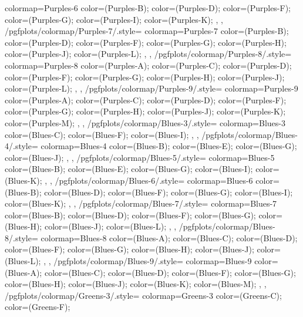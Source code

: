 {{    colormap={Purples-6}{
      color=(Purples-B);
      color=(Purples-D);
      color=(Purples-F);
      color=(Purples-G);
      color=(Purples-I);
      color=(Purples-K);
    },
  },
  /pgfplots/colormap/Purples-7/.style={
    colormap={Purples-7}{
      color=(Purples-B);
      color=(Purples-D);
      color=(Purples-F);
      color=(Purples-G);
      color=(Purples-H);
      color=(Purples-J);
      color=(Purples-L);
    },
  },
  /pgfplots/colormap/Purples-8/.style={
    colormap={Purples-8}{
      color=(Purples-A);
      color=(Purples-C);
      color=(Purples-D);
      color=(Purples-F);
      color=(Purples-G);
      color=(Purples-H);
      color=(Purples-J);
      color=(Purples-L);
    },
  },
  /pgfplots/colormap/Purples-9/.style={
    colormap={Purples-9}{
      color=(Purples-A);
      color=(Purples-C);
      color=(Purples-D);
      color=(Purples-F);
      color=(Purples-G);
      color=(Purples-H);
      color=(Purples-J);
      color=(Purples-K);
      color=(Purples-M);
    },
  },
  /pgfplots/colormap/Blues-3/.style={
    colormap={Blues-3}{
      color=(Blues-C);
      color=(Blues-F);
      color=(Blues-I);
    },
  },
  /pgfplots/colormap/Blues-4/.style={
    colormap={Blues-4}{
      color=(Blues-B);
      color=(Blues-E);
      color=(Blues-G);
      color=(Blues-J);
    },
  },
  /pgfplots/colormap/Blues-5/.style={
    colormap={Blues-5}{
      color=(Blues-B);
      color=(Blues-E);
      color=(Blues-G);
      color=(Blues-I);
      color=(Blues-K);
    },
  },
  /pgfplots/colormap/Blues-6/.style={
    colormap={Blues-6}{
      color=(Blues-B);
      color=(Blues-D);
      color=(Blues-F);
      color=(Blues-G);
      color=(Blues-I);
      color=(Blues-K);
    },
  },
  /pgfplots/colormap/Blues-7/.style={
    colormap={Blues-7}{
      color=(Blues-B);
      color=(Blues-D);
      color=(Blues-F);
      color=(Blues-G);
      color=(Blues-H);
      color=(Blues-J);
      color=(Blues-L);
    },
  },
  /pgfplots/colormap/Blues-8/.style={
    colormap={Blues-8}{
      color=(Blues-A);
      color=(Blues-C);
      color=(Blues-D);
      color=(Blues-F);
      color=(Blues-G);
      color=(Blues-H);
      color=(Blues-J);
      color=(Blues-L);
    },
  },
  /pgfplots/colormap/Blues-9/.style={
    colormap={Blues-9}{
      color=(Blues-A);
      color=(Blues-C);
      color=(Blues-D);
      color=(Blues-F);
      color=(Blues-G);
      color=(Blues-H);
      color=(Blues-J);
      color=(Blues-K);
      color=(Blues-M);
    },
  },
  /pgfplots/colormap/Greens-3/.style={
    colormap={Greens-3}{
      color=(Greens-C);
      color=(Greens-F);
}}}
